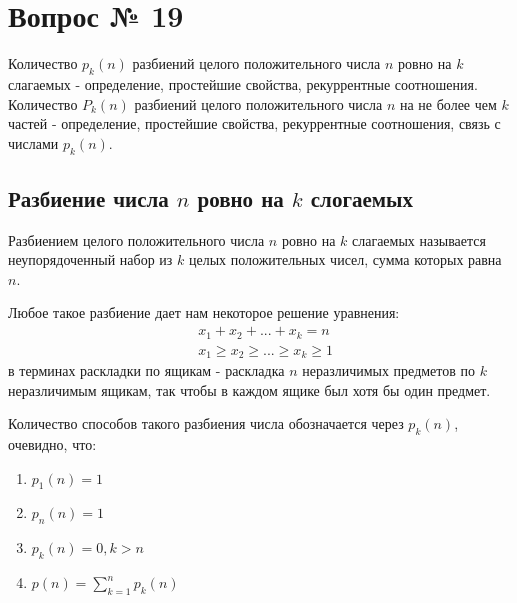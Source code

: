 \chapter{Вопрос № 19}

Количество $p_k\left(n\right)$ разбиений целого положительного числа $n$ ровно на $k$ слагаемых - определение, простейшие свойства, рекуррентные соотношения. Количество $P_k\left(n\right)$ разбиений целого положительного числа $n$ на не более чем $k$ частей - определение, простейшие свойства, рекуррентные соотношения, связь с числами $p_k\left(n\right)$.

\section{Разбиение числа $n$ ровно на $k$ слогаемых}

Разбиением целого положительного числа $n$ ровно на $k$ слагаемых называется неупорядоченный набор из $k$ целых положительных чисел, сумма которых равна $n$.

Любое такое разбиение дает нам некоторое решение уравнения:
\begin{equation}
	\begin{split}
		&x_1 + x_2 + ... + x_k = n \\
		&x_1\ge x_2\ge ... \ge x_k \ge 1
	\end{split}
\end{equation}
в терминах раскладки по ящикам - раскладка $n$ неразличимых предметов по $k$ неразличимым ящикам, так чтобы в каждом ящике был хотя бы один предмет.

Количество способов такого разбиения числа обозначается через $p_k\left(n\right)$, очевидно, что:
\begin{enumerate}
\item $p_1\left(n\right) = 1$

\item $p_n\left(n\right) = 1$

\item $p_k\left(n\right) = 0, k > n$

\item $p\left(n\right) = \sum_{k=1}^n p_k\left(n\right)$
\end{enumerate}

